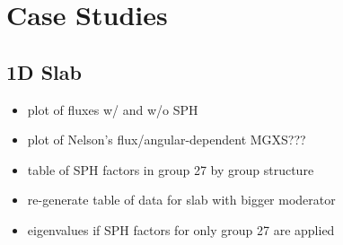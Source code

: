 \section{Case Studies}
\label{sec:chap5-sph-results}

\subsection{1D Slab}
\label{subsubsec:chap5-sph-slab}

\begin{itemize}[noitemsep]
  \item plot of fluxes w/ and w/o SPH
  \item plot of Nelson's flux/angular-dependent MGXS???
  \item table of SPH factors in group 27 by group structure
  \item re-generate table of data for slab with bigger moderator
  \item eigenvalues if SPH factors for only group 27 are applied
\end{itemize}

